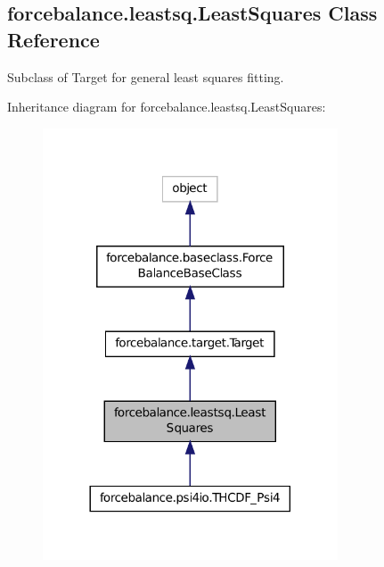 \hypertarget{classforcebalance_1_1leastsq_1_1LeastSquares}{\subsection{forcebalance.\-leastsq.\-Least\-Squares Class Reference}
\label{classforcebalance_1_1leastsq_1_1LeastSquares}
}


Subclass of Target for general least squares fitting.  




Inheritance diagram for forcebalance.\-leastsq.\-Least\-Squares\-:\nopagebreak
\begin{figure}[H]
\begin{center}
\leavevmode
\includegraphics[width=248pt]{classforcebalance_1_1leastsq_1_1LeastSquares__inherit__graph}
\end{center}
\end{figure}


